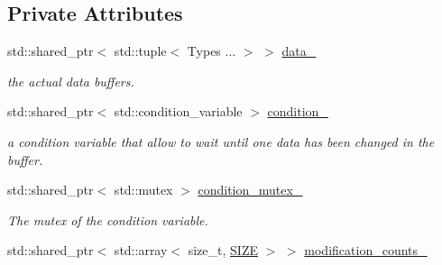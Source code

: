 \subsection*{Private Attributes}
\begin{DoxyCompactItemize}
\item 
\mbox{\label{classreal__time__tools_1_1ThreadsafeObject_a2e73d9d8db2fd54768adfd2f67df68fb}} 
std\+::shared\+\_\+ptr$<$ std\+::tuple$<$ Types ... $>$ $>$ \hyperlink{classreal__time__tools_1_1ThreadsafeObject_a2e73d9d8db2fd54768adfd2f67df68fb}{data\+\_\+}
\begin{DoxyCompactList}\small\item\em the actual data buffers. \end{DoxyCompactList}\item 
\mbox{\label{classreal__time__tools_1_1ThreadsafeObject_a0f39feab7508852adab81ad4318f47e6}} 
std\+::shared\+\_\+ptr$<$ std\+::condition\+\_\+variable $>$ \hyperlink{classreal__time__tools_1_1ThreadsafeObject_a0f39feab7508852adab81ad4318f47e6}{condition\+\_\+}
\begin{DoxyCompactList}\small\item\em a condition variable that allow to wait until one data has been changed in the buffer. \end{DoxyCompactList}\item 
\mbox{\label{classreal__time__tools_1_1ThreadsafeObject_a202a8fd66fe64138bc0cfa35a8dd745e}} 
std\+::shared\+\_\+ptr$<$ std\+::mutex $>$ \hyperlink{classreal__time__tools_1_1ThreadsafeObject_a202a8fd66fe64138bc0cfa35a8dd745e}{condition\+\_\+mutex\+\_\+}
\begin{DoxyCompactList}\small\item\em The mutex of the condition variable. \end{DoxyCompactList}\item 
\mbox{\label{classreal__time__tools_1_1ThreadsafeObject_a20e108057d1da31ebc416d5b3577ac21}} 
std\+::shared\+\_\+ptr$<$ std\+::array$<$ size\+\_\+t, \hyperlink{classreal__time__tools_1_1ThreadsafeObject_af05c02b66f0b75ea12cde9274bc2a97d}{S\+I\+ZE} $>$ $>$ \hyperlink{classreal__time__tools_1_1ThreadsafeObject_a20e108057d1da31ebc416d5b3577ac21}{modification\+\_\+counts\+\_\+}

\end{DoxyCompactItemize}
